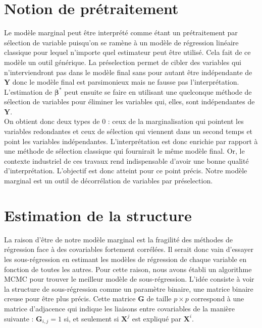 \documentclass[12pt,a4paper]{report}
\begin{document}
	\section{Notion de prétraitement}
	Le modèle marginal peut être interprété comme étant un prétraitement par sélection de variable puisqu'on se ramène à un modèle de régression linéaire classique pour lequel n'importe quel estimateur peut être utilisé. Cela fait de ce modèle un outil générique. La préselection permet de cibler des variables qui n'interviendront pas dans le modèle final sans pour autant être indépendante de $\boldsymbol{Y}$ donc le modèle final est parsimonieux mais ne fausse pas l'interprétation. L'estimation de $\boldsymbol{\beta}^*$ peut ensuite se faire en utilisant une quelconque méthode de sélection de variables pour éliminer les variables qui, elles, sont indépendantes de $\boldsymbol{Y}$.\\
	 On obtient donc deux types de 0 : ceux de la marginalisation qui pointent les variables redondantes et ceux de sélection qui viennent dans un second temps et point les variables indépendantes. L'interprétation est donc enrichie par rapport à une méthode de sélection classique qui fournirait le même modèle final. Or, le contexte industriel de ces travaux rend indispensable d'avoir une bonne qualité d'interprétation. L'objectif est donc atteint pour ce point précis. Notre modèle marginal est un outil de décorrélation de variables par préselection.
	 
	 \section{Estimation de la structure}
		La raison d'être de notre modèle marginal est la fragilité des méthodes de régression face à des covariables fortement corrélées. Il serait donc vain d'essayer les sous-régression en estimant les modèles de régression de chaque variable en fonction de toutes les autres. Pour cette raison, nous avons établi un algorithme MCMC pour trouver le meilleur modèle de sous-régression. L'idée consiste à voir la structure de sous-régression comme un paramètre binaire, une matrice binaire creuse pour être plus précis. Cette matrice $\boldsymbol{G}$ de taille $p\times p$ correspond à une matrice d'adjacence qui indique les liaisons entre covariables de la manière suivante : $\boldsymbol{G}_{i,j}=1$ si, et seulement si $\boldsymbol{X}^j$ est expliqué par $\boldsymbol{X}^i$. \\
		
\end{document}
